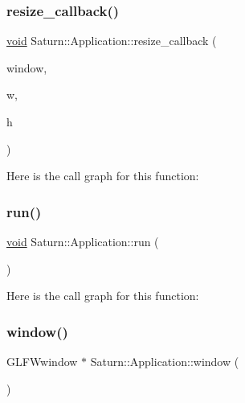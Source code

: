 \mbox{\label{class_saturn_1_1_application_a966c704c1afececffd75c3333df89be9}} 
\subsubsection{\texorpdfstring{resize\+\_\+callback()}{resize\_callback()}}
{\footnotesize\ttfamily \mbox{\hyperlink{glad_8h_a950fc91edb4504f62f1c577bf4727c29}{void}} Saturn\+::\+Application\+::resize\+\_\+callback (\begin{DoxyParamCaption}\item[{\mbox{[}\mbox{[}maybe\+\_\+unused\mbox{]} \mbox{]} G\+L\+F\+Wwindow $\ast$}]{window,  }\item[{int}]{w,  }\item[{int}]{h }\end{DoxyParamCaption})}

Here is the call graph for this function\+:
\mbox{\label{class_saturn_1_1_application_acc0350b28c588e9156c34226035a7314}} 
\subsubsection{\texorpdfstring{run()}{run()}}
{\footnotesize\ttfamily \mbox{\hyperlink{glad_8h_a950fc91edb4504f62f1c577bf4727c29}{void}} Saturn\+::\+Application\+::run (\begin{DoxyParamCaption}{ }\end{DoxyParamCaption})}

Here is the call graph for this function\+:
\mbox{\label{class_saturn_1_1_application_a0a819480dfc0fa3765415a943f987c4b}} 
\subsubsection{\texorpdfstring{window()}{window()}}
{\footnotesize\ttfamily G\+L\+F\+Wwindow $\ast$ Saturn\+::\+Application\+::window (\begin{DoxyParamCaption}{ }\end{DoxyParamCaption})}


